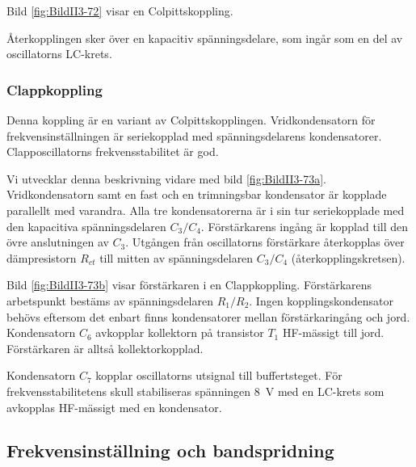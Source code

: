Bild \ref{fig:BildII3-72} visar en Colpittskoppling.

Återkopplingen sker över en kapacitiv spänningsdelare, som ingår som
en del av oscillatorns LC-krets.

\subsubsection{Clappkoppling}

Denna koppling är en variant av Colpittskopplingen.
Vridkondensatorn för frekvensinställningen är seriekopplad med spänningsdelarens
kondensatorer.
Clapposcillatorns frekvensstabilitet är god.

Vi utvecklar denna beskrivning vidare med bild \ref{fig:BildII3-73a}.
Vridkondensatorn samt en fast och en trimningsbar kondensator är kopplade
parallellt med varandra.
Alla tre kondensatorerna är i sin tur seriekopplade med den kapacitiva
spänningsdelaren \(C_3/C_4\).
Förstärkarens ingång är kopplad till den övre anslutningen av \(C_3\).
Utgången från oscillatorns förstärkare återkopplas över dämpresistorn
\(R_{ct}\) till mitten av spänningsdelaren \(C_3/C_4\)
(återkopplingskretsen).

Bild \ref{fig:BildII3-73b} visar förstärkaren i en Clappkoppling.
Förstärkarens arbetspunkt bestäms av spänningsdelaren \(R_1/R_2\).
Ingen kopplingskondensator behövs eftersom det enbart finns kondensatorer
mellan förstärkaringång och jord.
Kondensatorn \(C_6\) avkopplar kollektorn på transistor \(T_1\) HF-mässigt till
jord.
Förstärkaren är alltså kollektorkopplad.

Kondensatorn \(C_7\) kopplar oscillatorns utsignal till buffertsteget.
För frekvensstabilitetens skull stabiliseras spänningen 8~V med en
LC-krets som avkopplas HF-mässigt med en kondensator.

\subsection{Frekvensinställning och bandspridning}

